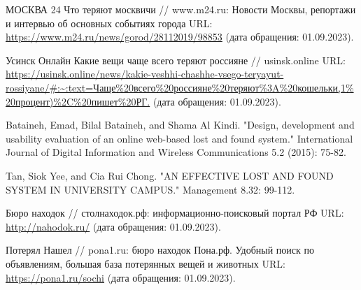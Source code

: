 \documentclass{mirea}
\begin{document}
	


	
\clearpage
\setcounter{page}{3}

\tableofcontents















\begin{thebibliography}{99\kern\bibindent}
	 МОСКВА 24 Что теряют москвичи // www.m24.ru: Новости Москвы, репортажи и интервью об основных событиях города URL: \url{https://www.m24.ru/news/gorod/28112019/98853} (дата обращения: 01.09.2023).
	
	 Усинск Онлайн Какие вещи чаще всего теряют россияне // usinsk.online URL: \url{https://usinsk.online/news/kakie-veshhi-chashhe-vsego-teryayut-rossiyane/#:~:text=Чаще%20всего%20россияне%20теряют%3A%20кошельки,1%20процент)%2C%20пишет%20РГ.} (дата обращения: 01.09.2023).
	
	 Bataineh, Emad, Bilal Bataineh, and Shama Al Kindi. "Design, development and usability evaluation of an online web-based lost and found system." International Journal of Digital Information and Wireless Communications 5.2 (2015): 75-82. %
	
	 Tan, Siok Yee, and Cia Rui Chong. "AN EFFECTIVE LOST AND FOUND SYSTEM IN UNIVERSITY CAMPUS." Management 8.32: 99-112. %
	
	
	 Бюро находок // столнаходок.рф: информационно-поисковый портал РФ URL: \url{http://nahodok.ru/} (дата обращения: 01.09.2023).
	
	 Потерял Нашел // pona1.ru: бюро находок Пона.рф. Удобный поиск по объявлениям, большая база потерянных вещей и животных URL: \url{https://pona1.ru/sochi} (дата обращения: 01.09.2023).
	

\end{thebibliography}
\end{document}
